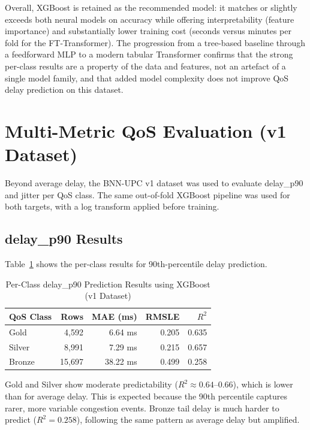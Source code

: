 \documentclass[a4paper,12pt]{Classes/RoboticsLaTeX}
\begin{document}
Overall, XGBoost is retained as the recommended model: it matches or slightly exceeds both neural models on accuracy while offering interpretability (feature importance) and substantially lower training cost (seconds versus minutes per fold for the FT-Transformer). The progression from a tree-based baseline through a feedforward MLP to a modern tabular Transformer confirms that the strong per-class results are a property of the data and features, not an artefact of a single model family, and that added model complexity does not improve QoS delay prediction on this dataset.

\section{Multi-Metric QoS Evaluation (v1 Dataset)}

Beyond average delay, the BNN-UPC v1 dataset was used to evaluate delay\_p90 and jitter per QoS class. The same out-of-fold XGBoost pipeline was used for both targets, with a log transform applied before training.

\subsection{delay\_p90 Results}

Table~\ref{tab:p90_results} shows the per-class results for 90th-percentile delay prediction.

\begin{table}[H]
\centering
\caption{Per-Class delay\_p90 Prediction Results using XGBoost (v1 Dataset)}
\label{tab:p90_results}
\begin{tabular}{|l|r|r|r|r|}
\hline
\textbf{QoS Class} & \textbf{Rows} & \textbf{MAE (ms)} & \textbf{RMSLE} & \textbf{$R^2$} \\
\hline
Gold & 4,592 & 6.64 ms & 0.205 & 0.635 \\
\hline
Silver & 8,991 & 7.29 ms & 0.215 & 0.657 \\
\hline
Bronze & 15,697 & 38.22 ms & 0.499 & 0.258 \\
\hline
\end{tabular}
\end{table}

Gold and Silver show moderate predictability ($R^2 \approx 0.64$--0.66), which is lower than for average delay. This is expected because the 90th percentile captures rarer, more variable congestion events. Bronze tail delay is much harder to predict ($R^2 = 0.258$), following the same pattern as average delay but amplified.
\end{document}
